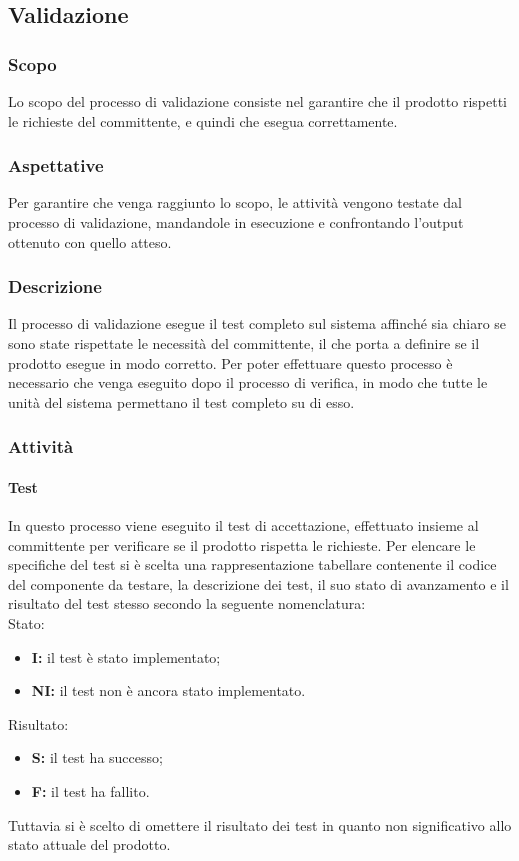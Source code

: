 \subsection{Validazione}

	\subsubsection{Scopo}
		Lo scopo del processo di validazione consiste nel garantire che il prodotto rispetti le richieste del committente, e quindi che esegua correttamente.
	\subsubsection{Aspettative}
		Per garantire che venga raggiunto lo scopo, le attività vengono testate dal processo di validazione, mandandole in esecuzione e confrontando l'output ottenuto con quello atteso.
	\subsubsection{Descrizione}
		Il processo di validazione esegue il test completo sul sistema affinché sia chiaro se sono state rispettate le necessità del committente, il che porta a definire se il prodotto esegue in modo corretto. Per poter effettuare questo processo è necessario che venga eseguito dopo il processo di verifica, in modo che tutte le unità del sistema permettano il test completo su di esso. 
	\subsubsection{Attività}
		\paragraph{Test}\mbox{}
			In questo processo viene eseguito il test di accettazione, effettuato insieme al committente per verificare se il prodotto rispetta le richieste.
			Per elencare le specifiche del test si è scelta una rappresentazione tabellare contenente il codice del componente da testare, la descrizione dei test, il suo stato di avanzamento e il risultato del test stesso secondo la seguente nomenclatura: \\
                Stato:
                \begin{itemize}
                    \item \textbf{I:} il test è stato implementato;
                    \item \textbf{NI:} il test non è ancora stato implementato.     
                \end{itemize}
                Risultato:
                \begin{itemize}
                    \item \textbf{S:} il test ha successo;
                    \item \textbf{F:} il test ha fallito.
                \end{itemize}
                Tuttavia si è scelto di omettere il risultato dei test in quanto non significativo allo stato attuale del prodotto.

